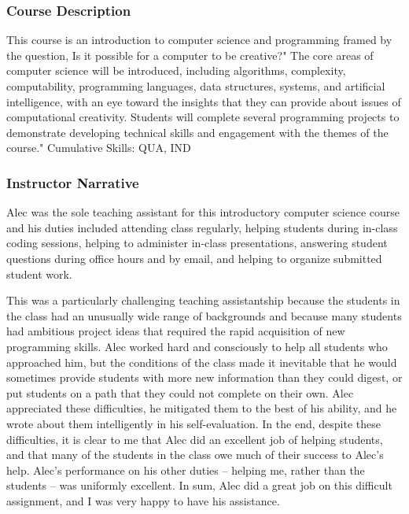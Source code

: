 
\subsubsection*{Course Description}
This course is an introduction to computer science and programming
framed by the question, Is it possible for a computer to be creative?"
The core areas of computer science will be introduced, including
algorithms, complexity, computability, programming languages, data
structures, systems, and artificial intelligence, with an eye toward the
insights that they can provide about issues of computational creativity.
Students will complete several programming projects to demonstrate
developing technical skills and engagement with the themes of the
course." Cumulative Skills: QUA, IND

\subsubsection*{Instructor Narrative}
Alec was the sole teaching assistant for this introductory computer
science course and his duties included attending class regularly,
helping students during in-class coding sessions, helping to administer
in-class presentations, answering student questions during office hours
and by email, and helping to organize submitted student work.
 
This was a particularly challenging teaching assistantship because
the students in the class had an unusually wide range of backgrounds
and because many students had ambitious project ideas that required
the rapid acquisition of new programming skills. Alec worked hard and
consciously to help all students who approached him, but the conditions
of the class made it inevitable that he would sometimes provide students
with more new information than they could digest, or put students on a
path that they could not complete on their own. Alec appreciated these
difficulties, he mitigated them to the best of his ability, and he wrote
about them intelligently in his self-evaluation. In the end, despite
these difficulties, it is clear to me that Alec did an excellent job of
helping students, and that many of the students in the class owe much of
their success to Alec's help. Alec's performance on his other duties --
helping me, rather than the students -- was uniformly excellent. In sum,
Alec did a great job on this difficult assignment, and I was very happy
to have his assistance.

